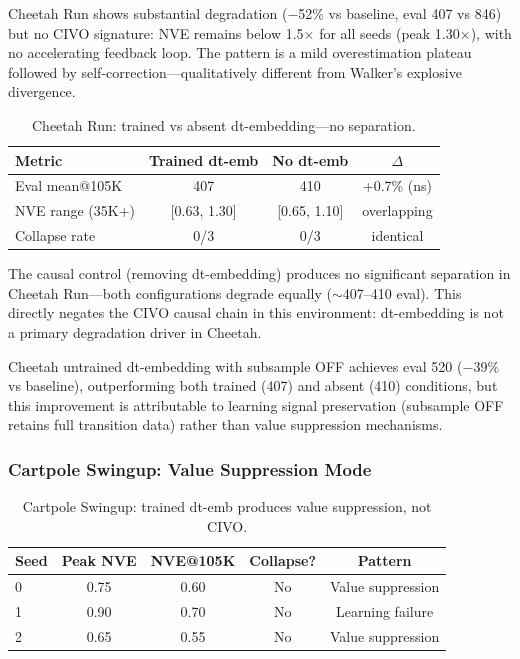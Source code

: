 \documentclass[10pt,letterpaper]{article}
\begin{document}
Cheetah Run shows substantial degradation ($-$52\% vs baseline, eval 407 vs 846) but no CIVO signature: NVE remains below 1.5$\times$ for all seeds (peak 1.30$\times$), with no accelerating feedback loop. The pattern is a mild overestimation plateau followed by self-correction---qualitatively different from Walker's explosive divergence.

\begin{table}[h]
\centering
\caption{Cheetah Run: trained vs absent dt-embedding---no separation.}
\label{tab:cheetah_causal}
\begin{tabular}{lccc}
\toprule
Metric & Trained dt-emb & No dt-emb & $\Delta$ \\
\midrule
Eval mean@105K & 407 & 410 & +0.7\% (ns) \\
NVE range (35K+) & [0.63, 1.30] & [0.65, 1.10] & overlapping \\
Collapse rate & 0/3 & 0/3 & identical \\
\bottomrule
\end{tabular}
\end{table}

The causal control (removing dt-embedding) produces no significant separation in Cheetah Run---both configurations degrade equally ($\sim$407--410 eval). This directly negates the CIVO causal chain in this environment: dt-embedding is not a primary degradation driver in Cheetah.

Cheetah untrained dt-embedding with subsample OFF achieves eval 520 ($-$39\% vs baseline), outperforming both trained (407) and absent (410) conditions, but this improvement is attributable to learning signal preservation (subsample OFF retains full transition data) rather than value suppression mechanisms.

\subsubsection{Cartpole Swingup: Value Suppression Mode}

\begin{table}[h]
\centering
\caption{Cartpole Swingup: trained dt-emb produces value suppression, not CIVO.}
\label{tab:cartpole_trained}
\begin{tabular}{lcccc}
\toprule
Seed & Peak NVE & NVE@105K & Collapse? & Pattern \\
\midrule
0 & 0.75 & 0.60 & No & Value suppression \\
1 & 0.90 & 0.70 & No & Learning failure \\
2 & 0.65 & 0.55 & No & Value suppression \\
\bottomrule
\end{tabular}
\end{table}
\end{document}
